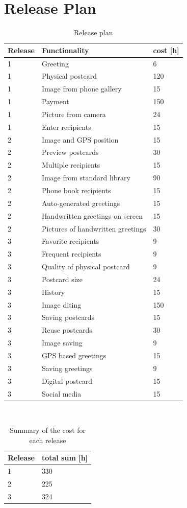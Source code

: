 \documentclass[10pt,a4paper]{article}
\begin{document}
\section{Release Plan}

\begin{table}[h!]
\centering
\label{table:release}
\begin{tabular}{| l | l | l | } \hline
\textbf{Release} & \textbf{Functionality} & \textbf{cost [h]} \\ \hline
1 & Greeting & 6\\ \hline
1 & Physical postcard & 120\\ \hline
1 & Image from phone gallery & 15\\ \hline
1 & Payment & 150\\ \hline
1 & Picture from camera & 24\\ \hline
1 & Enter recipients & 15\\ \hline
2 & Image and GPS position & 15\\ \hline
2 & Preview postcards & 30\\ \hline
2 & Multiple recipients & 15\\ \hline
2 & Image from standard library & 90\\ \hline
2 & Phone book recipients & 15\\ \hline
2 & Auto-generated greetings & 15\\ \hline
2 & Handwritten greetings on screen & 15\\ \hline
2 & Pictures of handwritten greetings & 30\\ \hline
3 &  Favorite recipients & 9\\ \hline
3 & Frequent recipients & 9\\ \hline
3 & Quality of physical postcard & 9\\ \hline
3 & Postcard size & 24\\ \hline
3 & History & 15\\ \hline
3 & Image diting & 150\\ \hline
3 & Saving postcards & 15\\ \hline
3 & Reuse postcards & 30\\ \hline
3 & Image saving & 9\\ \hline
3 & GPS based greetings &15\\ \hline
3 & Saving greetings & 9\\ \hline
3 & Digital postcard &15\\ \hline
3 & Social media &15\\ \hline
\end{tabular}\\
\caption{Release plan}
\end{table}


\begin{table}[h!]
\centering
\label{table:SumRelease}
\begin{tabular}{| l | l |} \hline
\textbf{Release} & \textbf{total sum [h]} \\ \hline

1 &  330 \\ \hline
2 & 225 \\ \hline
3 & 324 \\ \hline
\end{tabular}\\
\caption{Summary of the cost for each release}
\end{table}
\end{document}
